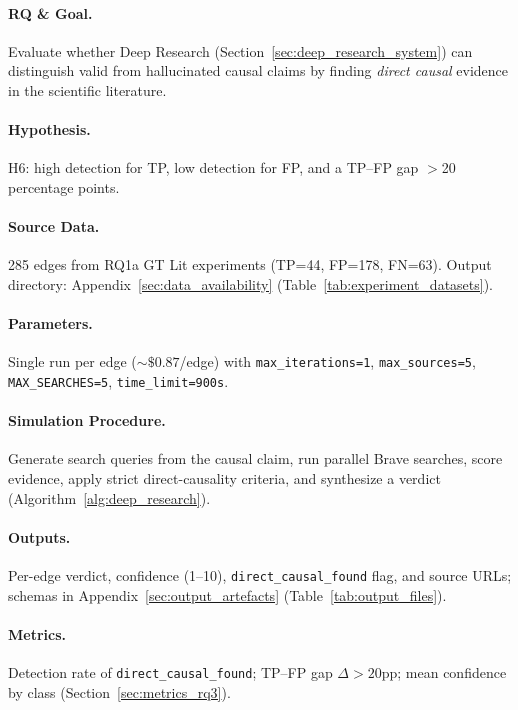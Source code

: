 \paragraph{RQ \& Goal.}
Evaluate whether Deep Research (Section~\ref{sec:deep_research_system}) can distinguish valid from hallucinated causal claims by finding \emph{direct causal} evidence in the scientific literature.

\paragraph{Hypothesis.}
H6: high detection for TP, low detection for FP, and a TP--FP gap $>$20 percentage points.

\paragraph{Source Data.}
285 edges from RQ1a GT Lit experiments (TP=44, FP=178, FN=63). Output directory: Appendix~\ref{sec:data_availability} (Table~\ref{tab:experiment_datasets}).

\paragraph{Parameters.}
Single run per edge ($\sim\$0.87$/edge) with \texttt{max\_iterations=1}, \texttt{max\_sources=5}, \texttt{MAX\_SEARCHES=5}, \texttt{time\_limit=900s}.

\paragraph{Simulation Procedure.}
Generate search queries from the causal claim, run parallel Brave searches, score evidence, apply strict direct-causality criteria, and synthesize a verdict (Algorithm~\ref{alg:deep_research}).

\paragraph{Outputs.}
Per-edge verdict, confidence (1--10), \texttt{direct\_causal\_found} flag, and source URLs; schemas in Appendix~\ref{sec:output_artefacts} (Table~\ref{tab:output_files}).

\paragraph{Metrics.}
Detection rate of \texttt{direct\_causal\_found}; TP--FP gap $\Delta>20$pp; mean confidence by class (Section~\ref{sec:metrics_rq3}).


